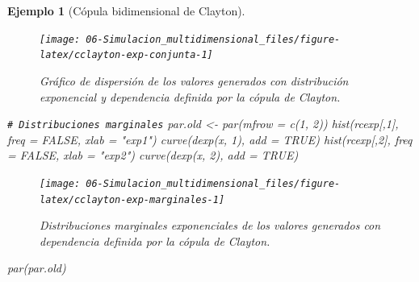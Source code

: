 \documentclass[
]{book}
\newenvironment{Shaded}{\begin{snugshade}}{\end{snugshade}}
\newcommand{\AttributeTok}[1]{\textcolor[rgb]{0.77,0.63,0.00}{#1}}
\newcommand{\CommentTok}[1]{\textcolor[rgb]{0.56,0.35,0.01}{\textit{#1}}}
\newcommand{\ConstantTok}[1]{\textcolor[rgb]{0.00,0.00,0.00}{#1}}
\newcommand{\DecValTok}[1]{\textcolor[rgb]{0.00,0.00,0.81}{#1}}
\newcommand{\FunctionTok}[1]{\textcolor[rgb]{0.00,0.00,0.00}{#1}}
\newcommand{\NormalTok}[1]{#1}
\newcommand{\OtherTok}[1]{\textcolor[rgb]{0.56,0.35,0.01}{#1}}
\newcommand{\StringTok}[1]{\textcolor[rgb]{0.31,0.60,0.02}{#1}}
\theoremstyle{break}
\newtheorem{example}{Ejemplo}[chapter]
\theoremstyle{nonumberplain}
\renewcommand{\CommentTok}[1]{\textcolor[rgb]{0.41,0.41,0.41}{\texttt{#1}}}
\begin{document}
\begin{example}[Cópula bidimensional de Clayton]
\begin{figure}[!htb]

{\centering \texttt{[image: 06-Simulacion\_multidimensional\_files/figure-latex/cclayton-exp-conjunta-1]} 

}

\caption{Gráfico de dispersión de los valores generados con distribución exponencial y dependencia definida por la cópula de Clayton.}\label{fig:cclayton-exp-conjunta}
\end{figure}

\begin{Shaded}
\begin{Highlighting}[]
\CommentTok{\# Distribuciones marginales}
\NormalTok{par.old }\OtherTok{\textless{}{-}} \FunctionTok{par}\NormalTok{(}\AttributeTok{mfrow =} \FunctionTok{c}\NormalTok{(}\DecValTok{1}\NormalTok{, }\DecValTok{2}\NormalTok{))}
\FunctionTok{hist}\NormalTok{(rcexp[,}\DecValTok{1}\NormalTok{], }\AttributeTok{freq =} \ConstantTok{FALSE}\NormalTok{, }\AttributeTok{xlab =} \StringTok{"exp1"}\NormalTok{)}
\FunctionTok{curve}\NormalTok{(}\FunctionTok{dexp}\NormalTok{(x, }\DecValTok{1}\NormalTok{), }\AttributeTok{add =} \ConstantTok{TRUE}\NormalTok{)}
\FunctionTok{hist}\NormalTok{(rcexp[,}\DecValTok{2}\NormalTok{], }\AttributeTok{freq =} \ConstantTok{FALSE}\NormalTok{, }\AttributeTok{xlab =} \StringTok{"exp2"}\NormalTok{)}
\FunctionTok{curve}\NormalTok{(}\FunctionTok{dexp}\NormalTok{(x, }\DecValTok{2}\NormalTok{), }\AttributeTok{add =} \ConstantTok{TRUE}\NormalTok{)}
\end{Highlighting}
\end{Shaded}

\begin{figure}[!htb]

{\centering \texttt{[image: 06-Simulacion\_multidimensional\_files/figure-latex/cclayton-exp-marginales-1]} 

}

\caption{Distribuciones marginales exponenciales de los valores generados con dependencia definida por la cópula de Clayton.}\label{fig:cclayton-exp-marginales}
\end{figure}

\begin{Shaded}
\begin{Highlighting}[]
\FunctionTok{par}\NormalTok{(par.old)}
\end{Highlighting}
\end{Shaded}

\end{example}
\end{document}

